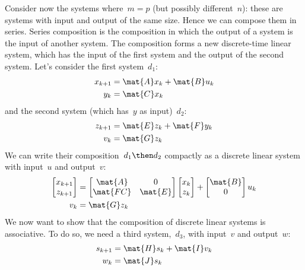   Consider now the systems where~$m=p$ (but possibly different~$n$): these are systems with
  input and output of the same size. Hence we can compose them in series. Series composition is the composition in which the output of a system is the input of another system. The composition forms a new discrete-time linear system,
which has the input of the first system and the output of the second system. Let's consider the first system~$d_1$:
\begin{equation*}
\label{eq:dlin-1}
      \begin{aligned}
        x_{k+1} &= \mat{A} x_k  + \mat{B} u_k \\
        y_{k}   &= \mat{C} x_k  \\
      \end{aligned}
    \end{equation*}
and the second system (which has~$y$ as input)~$d_2$:
\begin{equation*}
\label{eq:dlin-2}
      \begin{aligned}
        z_{k+1} &= \mat{E} z_k  + \mat{F} y_k \\
        v_{k}   &= \mat{G} z_k  \\
      \end{aligned}
    \end{equation*}
We can write their composition~$d_1\then d_2$ compactly as a discrete linear system with input~$u$ and output~$v$:
\begin{equation*}
\label{eq:dlin-3}
\begin{aligned}
\begin{bmatrix}
x_{k+1}\\
z_{k+1}
\end{bmatrix}&=
\begin{bmatrix}
\mat{A}&0\\
\mat{FC}&\mat{E}
\end{bmatrix}\begin{bmatrix} x_k\\ z_k\end{bmatrix}+
\begin{bmatrix}
\mat{B}\\ 0
\end{bmatrix}u_k\\
v_k&=\mat{G}z_k
\end{aligned}
\end{equation*}
We now want to show that the composition of discrete linear systems is associative. To do so, we need a third system,~$d_3$, with input~$v$ and output~$w$:
\begin{equation*}
\label{eq:dlin-4}
      \begin{aligned}
        s_{k+1} &= \mat{H} s_k  + \mat{I} v_k \\
        w_{k}   &= \mat{J} s_k  \\
      \end{aligned}
    \end{equation*}

